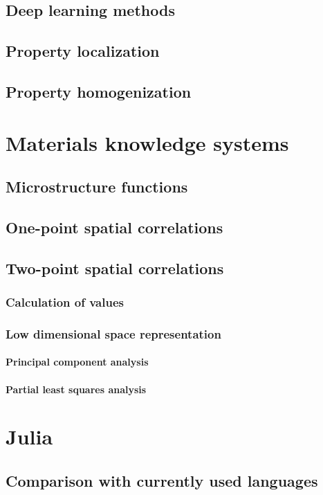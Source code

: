 \subsection{Deep learning methods}
\subsection{Property localization}
\subsection{Property homogenization}

\section{Materials knowledge systems}

\subsection{Microstructure functions}
\subsection{One-point spatial correlations}
\subsection{Two-point spatial correlations}
\subsubsection{Calculation of values}
\subsubsection{Low dimensional space representation}
\paragraph{Principal component analysis}
\paragraph{Partial least squares analysis}

\section{Julia}

\subsection{Comparison with currently used languages}

